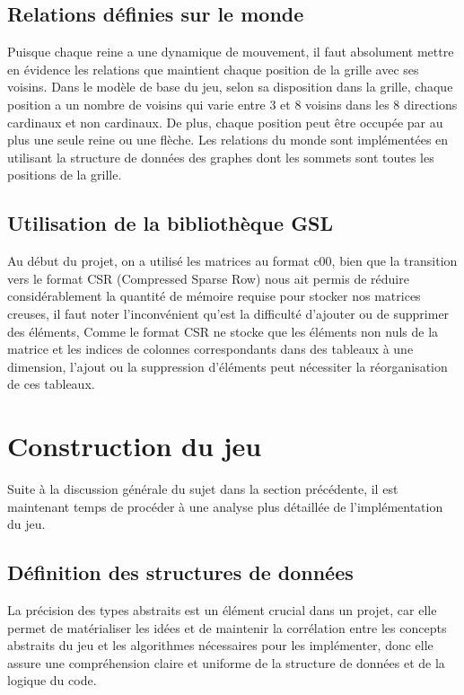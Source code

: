 \documentclass[11pt]{article}
\begin{document}
        \subsection{Relations définies sur le monde}
        Puisque chaque reine a une dynamique de mouvement, il faut absolument mettre en
    évidence les relations que maintient chaque position de la grille avec ses voisins. Dans le modèle de base du jeu, selon sa disposition dans la grille, chaque position a un nombre de voisins qui varie entre 3 et 8 voisins dans les 8 directions cardinaux et non cardinaux. De plus, chaque position peut être occupée par au plus une seule reine ou une flèche. Les relations du monde sont implémentées en utilisant la structure de données des graphes dont les sommets sont toutes les positions de la grille.
        \subsection{Utilisation de la bibliothèque GSL}
Au début du projet, on a utilisé les matrices au format c00, bien que la transition vers le format  CSR (Compressed Sparse Row) nous ait permis de réduire considérablement la quantité de mémoire requise pour stocker nos matrices creuses, il faut noter l'inconvénient qu'est la difficulté d'ajouter ou de supprimer des éléments, Comme le format CSR ne stocke que les éléments non nuls de la matrice et les indices de colonnes correspondants dans des tableaux à une dimension, l'ajout ou la suppression d'éléments peut nécessiter la réorganisation de ces tableaux.

        
    \section{Construction du jeu}
    Suite à la discussion générale du sujet dans la section précédente, il est maintenant temps de procéder à une analyse plus détaillée de l'implémentation du jeu.
        \subsection{Définition des structures de données}
         La précision des types abstraits est un élément crucial dans un projet, car elle permet de matérialiser les idées et de maintenir la corrélation entre les concepts abstraits du jeu et les algorithmes nécessaires pour les implémenter, donc elle  assure une compréhension claire et uniforme de la structure de données et de la logique du code.
\end{document}
